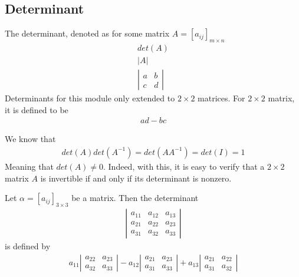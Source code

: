 \documentclass[a4paper]{article}
\theoremstyle{plain}
\newtheorem*{cor}{Corollary}
\theoremstyle{definition}
\newtheorem{defn}{Definition}[section]
\theoremstyle{remark}
\begin{document}
\subsection{Determinant}
\begin{tcolorbox}[colback=black!3!white,colframe=black!60!white,title=\begin{defn}Determinant \label{Determinant}\end{defn}]
The determinant, denoted as for some matrix $A = [a_{ij}]_{m \times n}$
\begin{align}
det(A) \\
|A| \\
\left|
\begin{array}{cc}
	a & b \\
	c & d
\end{array}\right|
\end{align}
Determinants for this module only extended to $2\times 2$ matrices. For $2\times 2$ matrix, it is defined to be
\begin{align}
	ad-bc
\end{align}
\end{tcolorbox}
\begin{tcolorbox}[colback=black!3!white,colframe=black!60!white,title=\begin{cor}A matrix is invertible if its determinan is non-zero \label{A matrix is invertible if its determinan is non-zero}\end{cor}]
        We know that
	\begin{align*}
		det(A)det(A^{-1}) = det(AA^{-1}) = det(I) = 1
	\end{align*}
	Meaning that $det(A) \neq 0$. Indeed, with this, it is easy to verify that a  $2\times 2$ matrix $A$ is invertible if and only if its determinant is nonzero. 
\end{tcolorbox}
Let $\alpha = [a_{ij}]_{3\times 3}$ be a matrix. Then the determinant
\begin{align*}\left|
	\begin{array}{ccc}
		a_{11} & a_{12} & a_{13} \\
		a_{21} & a_{22} & a_{23} \\
		a_{31} & a_{32} & a_{33}
	\end{array}\right|
\end{align*}
is defined by
\begin{align*}
	a_{11} \left| \begin{array}{cc}
	a_{22} & a_{23} \\
		a_{32} & a_{33}
		\end{array} \right| - a_{12} \left| \begin{array}{cc}
		a_{21} & a_{23} \\
		a_{31} & a_{33}
		\end{array}\right| + a_{13} \left| \begin{array}{cc}
		a_{21} & a_{22} \\
		a_{31} & a_{32}
		\end{array}\right|
\end{align*}
\end{document}
